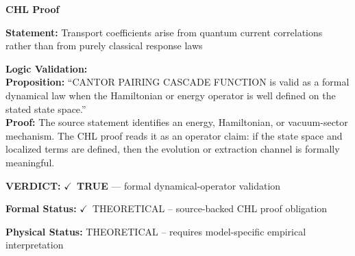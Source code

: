 \vspace{0.45em}
\noindent\textbf{CHL Proof}\par
\textbf{Statement:} Transport coefficients arise from quantum current correlations rather than from purely
classical response laws

\textbf{Logic Validation:}\\
\textbf{Proposition:} ``CANTOR PAIRING CASCADE FUNCTION is valid as a formal dynamical law when the Hamiltonian
or energy operator is well defined on the stated state space.''\\
\textbf{Proof:} The source statement identifies an energy, Hamiltonian, or vacuum-sector mechanism. The
CHL proof reads it as an operator claim: if the state space and localized terms are
defined, then the evolution or extraction channel is formally meaningful.

\textbf{VERDICT:} \ensuremath{\checkmark}\ \textbf{TRUE} --- formal dynamical-operator validation

\textbf{Formal Status:} \ensuremath{\checkmark}\ THEORETICAL -- source-backed CHL proof obligation

\textbf{Physical Status:} THEORETICAL -- requires model-specific empirical interpretation
\par\vspace{0.45em}
\par
\ifTZPDarkEdition
{}
\fi
\endgroup
\endgroup
